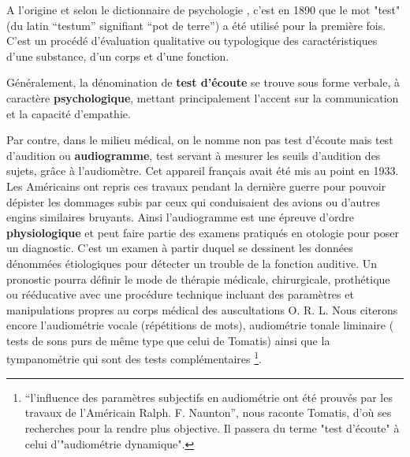 A l'origine et selon le dictionnaire de psychologie \autocite {doronparot}, c'est en 1890 que le mot "test" (du latin ``testum''
signifiant ``pot de terre'') a été utilisé pour la
première fois. C'est un procédé d'évaluation qualitative ou
typologique des caractéristiques d'une substance, d'un corps et d'une
fonction.

Généralement, la dénomination de \textbf{test d'écoute} se trouve sous forme verbale,
à caractère
\textbf{psychologique}, mettant principalement l'accent sur la communication
et la capacité d'empathie.


Par contre, dans le milieu médical, on le nomme non pas test d'écoute mais test d'audition ou \textbf{audiogramme}, test servant à mesurer les seuils d'audition des sujets, grâce à l'audiomètre. Cet
appareil français avait été mis au point en 1933. Les Américains
ont repris ces travaux pendant la dernière guerre pour pouvoir dépister
les dommages subis par ceux qui conduisaient des avions ou d'autres
engins similaires bruyants.
Ainsi l'audiogramme est une épreuve d'ordre \textbf{physiologique} et peut faire partie des examens  pratiqués en otologie
pour poser un diagnostic.
   C'est un examen à partir duquel se
  dessinent les données dénommées étiologiques
  pour détecter un trouble de la fonction auditive. Un pronostic pourra définir le mode de thérapie
médicale, chirurgicale, prothétique ou rééducative avec une procédure
technique incluant des paramètres et manipulations propres au corps
médical des auscultations O. R. L.
Nous citerons encore l'audiométrie vocale (répétitions de mots), audiométrie tonale liminaire ( tests de sons purs de même type que celui de Tomatis) ainsi que la tympanométrie qui sont des tests complémentaires %
\footnote{\enquote {l'influence des paramètres subjectifs en audiométrie ont été prouvés par les travaux de l'Américain Ralph. F. Naunton}, nous raconte Tomatis,\autocite[69] {tomatisoreilletvie} d'où ses recherches pour la rendre plus objective. Il passera du terme "test d'écoute" à celui d'"audiométrie dynamique".}.

